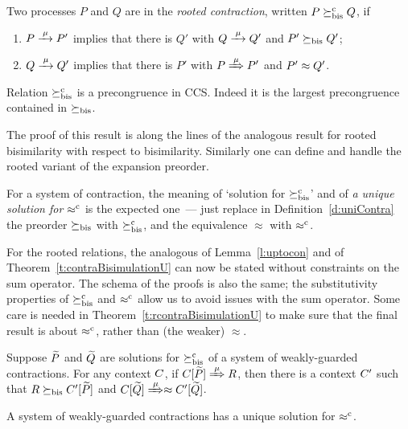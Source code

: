 \begin{definition}
\label{d:rcontra}
Two processes $P$ and $Q$ are in the \emph{rooted contraction}, written 
 $P\mathrel{\succeq^{\rm{c}}_{\rm{bis}}} Q$, if
\begin{enumerate}
\item $P \arr\mu P'$ implies that there is $Q'$ with $Q \arr \mu Q'$
 and $P'\mathrel{\succeq_{\rm{bis}}} Q'$;
\item $Q \arr\mu Q'$   implies that there is $P'$ with $P \Arr \mu
 P'$ and $P' \approx Q'$.
\end{enumerate}
\end{definition}

\begin{theorem}
\label{t:rcontrPrecongruence}
Relation $\mathrel{\succeq^{\rm{c}}_{\rm{bis}}}$ is a precongruence in CCS.  Indeed it is the
largest precongruence contained in $\mathrel{\succeq_{\rm{bis}}}$.
\end{theorem}  

The proof of this result is along the lines of the analogous result
for rooted bisimilarity with respect to bisimilarity. 
Similarly one can define and handle the rooted variant of the expansion preorder. 


For a system of contraction, the meaning of 
`solution  for $\mathrel{\succeq^{\rm{c}}_{\rm{bis}}}$' and of 
 \emph{a unique 
solution for $\mathrel{\approx^{\rm{c}}}$}
is the expected one~--- just replace in Definition~\ref{d:uniContra}  the preorder 
$\mathrel{\succeq_{\rm{bis}}}$ with $\mathrel{\succeq^{\rm{c}}_{\rm{bis}}}$, and the equivalence 
$\approx$ with $\mathrel{\approx^{\rm{c}}}$.

For the rooted relations, the analogous of Lemma~\ref{l:uptocon} and of
Theorem~\ref{t:contraBisimulationU} can now be stated without constraints on the sum
operator.  
The schema of the proofs is also the same; the substitutivity
properties of 
$\mathrel{\succeq^{\rm{c}}_{\rm{bis}}}$ and $\mathrel{\approx^{\rm{c}}}$ allow us to avoid issues with the sum
operator. Some care is needed in Theorem~\ref{t:rcontraBisimulationU}
to make sure that the final result is about  
$\mathrel{\approx^{\rm{c}}}$, rather than (the weaker) $\approx$.


\begin{lemma}
\label{l:ruptocon}
Suppose $\widetilde P$ and $\widetilde Q$ are solutions  for $\mathrel{\succeq^{\rm{c}}_{\rm{bis}}}$ 
 of a system of weakly-guarded
contractions.
For any context $C$, 
if  $\ct{\til P}\Arr{\mu}  R$,
 then 
there is a  context $C'$
such that $R \mathrel{\succeq_{\rm{bis}}} C' [\widetilde P]$ and  $\ct{\til Q} \Arr{\mu}
 \wb \ctp{\til Q}$.
\end{lemma}

\begin{theorem}
\label{t:rcontraBisimulationU}
A system of weakly-guarded contractions
    has 
a unique solution 
 for $\mathrel{\approx^{\rm{c}}}$.
\end{theorem} 

